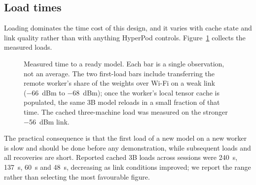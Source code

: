 \subsection{Load times}
\label{sec:load}

Loading dominates the time cost of this design, and it varies with cache state
and link quality rather than with anything HyperPod controls.
Figure~\ref{fig:load} collects the measured loads.

\begin{figure}[htbp]
\centering
{}
\caption{Measured time to a ready model. Each bar is a single observation, not
an average. The two first-load bars include transferring the remote worker's
share of the weights over Wi-Fi on a weak link (\SI{-66}{dBm} to
\SI{-68}{dBm}); once the worker's local tensor cache is populated, the same 3B
model reloads in a small fraction of that time. The cached three-machine load
was measured on the stronger \SI{-56}{dBm} link.}
\label{fig:load}
\end{figure}

The practical consequence is that the first load of a new model on a new worker
is slow and should be done before any demonstration, while subsequent loads and
all recoveries are short. Reported cached 3B loads across sessions were
\SI{240}{\second}, \SI{137}{\second}, \SI{60}{\second} and \SI{48}{\second},
decreasing as link conditions improved; we report the range rather than
selecting the most favourable figure.
